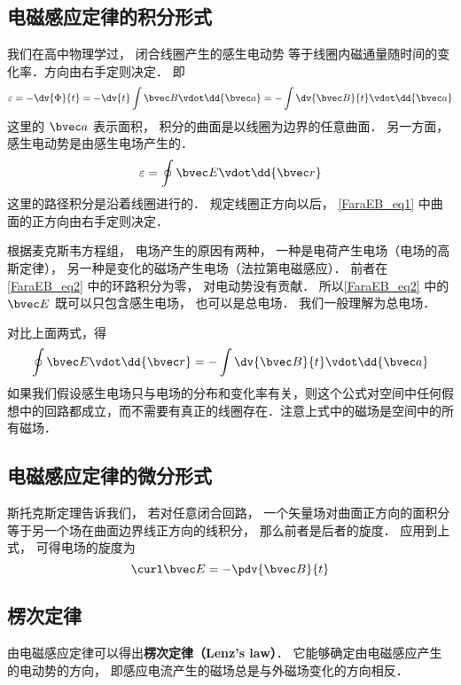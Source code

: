 
\begin{issues}
\issueAbstract
\issueTODO
\end{issues}


\subsection{电磁感应定律的积分形式}

我们在高中物理学过， 闭合线圈产生的感生电动势 %
等于线圈内磁通量随时间的变化率．方向由右手定则决定． 即
\begin{equation}\label{FaraEB_eq1}
\varepsilon  =  -\dv{\Phi}{t} =  - \dv{t} \int \bvec B \vdot \dd{\bvec a} =  - \int \dv{\bvec B}{t} \vdot \dd{\bvec a}
\end{equation} 
这里的 $\bvec a$ 表示面积， 积分的曲面是以线圈为边界的任意曲面． 另一方面，感生电动势是由感生电场产生的． 
\begin{equation}\label{FaraEB_eq2}
\varepsilon  = \oint \bvec E \vdot \dd{\bvec r}
\end{equation}
这里的路径积分是沿着线圈进行的． 规定线圈正方向以后， \autoref{FaraEB_eq1} 中曲面的正方向由右手定则决定．

根据麦克斯韦方程组， 电场产生的原因有两种， 一种是电荷产生电场（电场的高斯定律）， 另一种是变化的磁场产生电场（法拉第电磁感应）． 前者在\autoref{FaraEB_eq2} 中的环路积分为零， 对电动势没有贡献． 所以\autoref{FaraEB_eq2} 中的 $\bvec E$ 既可以只包含感生电场， 也可以是总电场． 我们一般理解为总电场．

对比上面两式，得
\begin{equation}
\oint \bvec E \vdot \dd{\bvec r}  =  - \int \dv{\bvec B}{t} \vdot \dd{\bvec a} 
\end{equation} 
如果我们假设感生电场只与电场的分布和变化率有关，则这个公式对空间中任何假想中的回路都成立，而不需要有真正的线圈存在．注意上式中的磁场是空间中的所有磁场．

\subsection{电磁感应定律的微分形式}
斯托克斯定理告诉我们， 若对任意闭合回路， 一个矢量场对曲面正方向的面积分等于另一个场在曲面边界线正方向的线积分， 那么前者是后者的旋度．
应用到上式， 可得电场的旋度为
\begin{equation}\label{FaraEB_eq3}
\curl \bvec E =  - \pdv{\bvec B}{t}
\end{equation} 

\subsection{楞次定律}
由电磁感应定律可以得出\textbf{楞次定律（Lenz's law）}． 它能够确定由电磁感应产生的电动势的方向， 即感应电流产生的磁场总是与外磁场变化的方向相反． 
